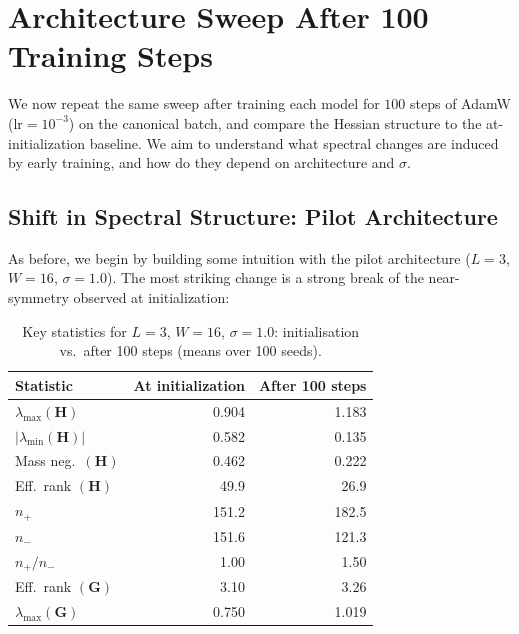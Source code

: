 \documentclass[12pt,a4paper]{article}
\newcommand{\bH}{\mathbf{H}}
\newcommand{\bG}{\mathbf{G}}
\begin{document}
\section{Architecture Sweep After 100 Training Steps}
\label{sec:step100}

We now repeat the same sweep after training each model for $100$ steps of AdamW ($\text{lr} = 10^{-3}$) on the canonical batch, and compare the Hessian structure to the at-initialization baseline.
We aim to understand what spectral changes are induced by early training, and how do they depend on architecture and $\sigma$.

\subsection{Shift in Spectral Structure: Pilot Architecture}
\label{ssec:step100_pilot}

As before, we begin by building some intuition with the pilot architecture ($L=3$, $W=16$, $\sigma=1.0$). The most striking change is a strong break of the near-symmetry observed at initialization:

\begin{table}[H]
  \centering
  \caption{Key statistics for $L=3$, $W=16$, $\sigma=1.0$: initialisation vs.\ after 100 steps
           (means over 100 seeds).}
  \label{tab:step100_pilot}
  \begin{tabular}{@{}lrr@{}}
    \toprule
    Statistic & At initialization & After 100 steps \\
    \midrule
    $\lambda_{\max}(\bH)$     & 0.904 & 1.183 \\
    $|\lambda_{\min}(\bH)|$   & 0.582 & 0.135 \\
    Mass neg.\ $(\bH)$        & 0.462 & 0.222 \\
    Eff.\ rank $(\bH)$        & 49.9  & 26.9 \\
    $n_+$                      & 151.2 & 182.5 \\
    $n_-$                      & 151.6 & 121.3 \\
    $n_+/n_-$                  & 1.00  & 1.50 \\
    Eff.\ rank $(\bG)$         & 3.10  & 3.26 \\
    $\lambda_{\max}(\bG)$      & 0.750 & 1.019 \\
    \bottomrule
  \end{tabular}
\end{table}
\end{document}
